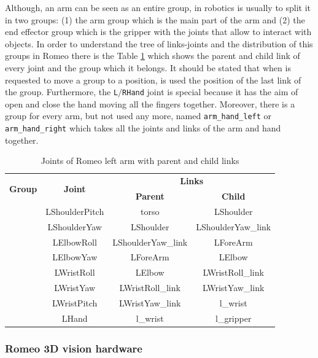 \documentclass[12pt,a4paper,final,twoside,openright]{report}
\begin{document}
Although, an arm can be seen as an entire group, in robotics is usually to split it in two groups: (1) the arm group which is the main part of the arm and (2) the end effector group which is the gripper with the joints that allow to interact with objects. In order to understand the tree of links-joints and the distribution of this groups in Romeo there is the Table \ref{tab:tree_group_links_joint} which shows the parent and child link of every joint and the group which it belongs. It should be stated that when is requested to move a group to a position, is used the position of the last link of the group. Furthermore, the \texttt{L$/$RHand} joint is special because it has the aim of open and close the hand moving all the fingers together. Moreover, there is a group for every arm, but not used any more, named \texttt{arm\_hand\_left} or \texttt{arm\_hand\_right} which takes all the joints and links of the arm and hand together.

\begin{table}[h]
\begin{center}
\begin{tabular}{|c|c|c|c|}
\hline
\multirow{2}{*}{\textbf{Group}} & \multirow{2}{*}{\textbf{Joint}} & \multicolumn{2}{|c|}{\textbf{Links}} \\ \cline{3-4}\noalign{\smallskip} &  & \textbf{Parent} & \textbf{Child} \\ \hline\noalign{\smallskip}
\multirow{6}{*}{left\_arm}
& LShoulderPitch & torso & LShoulder \\
& LShoulderYaw & LShoulder & LShoulderYaw\_link \\
& LElbowRoll & LShoulderYaw\_link & LForeArm \\
& LElbowYaw & LForeArm & LElbow \\                            
& LWristRoll & LElbow & LWristRoll\_link \\                   
& LWristYaw & LWristRoll\_link & LWristYaw\_link \\ \hline\noalign{\smallskip}
\multirow{2}{*}{left\_hand}
& LWristPitch & LWristYaw\_link & l\_wrist \\
& LHand & l\_wrist & l\_gripper \\ \hline
\end{tabular}
\caption{Joints of Romeo left arm with parent and child links\label{tab:tree_group_links_joint}}
\end{center}
\end{table}

\subsubsection{Romeo 3D vision hardware}
\end{document}
